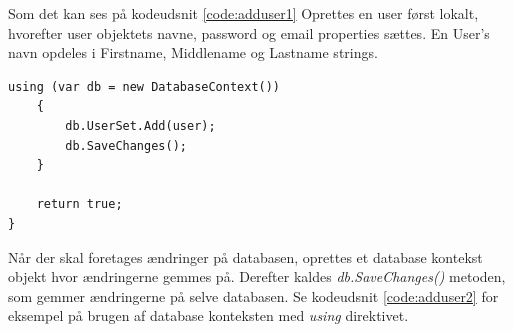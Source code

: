 Som det kan ses på kodeudsnit \ref{code:adduser1} Oprettes en user først lokalt, hvorefter user objektets navne, password og email properties sættes. En User's navn opdeles i Firstname, Middlename og Lastname strings. 

\begin{lstlisting}[caption=User objektet tilføjes i database konteksten hvorefter der gemmes på selve databasen,label=code:adduser2]
	using (var db = new DatabaseContext())
	{
		db.UserSet.Add(user);
		db.SaveChanges();
	}

	return true;
}
\end{lstlisting}

Når der skal foretages ændringer på databasen, oprettes et database kontekst objekt hvor ændringerne gemmes på. Derefter kaldes \textit{db.SaveChanges()} metoden, som gemmer ændringerne på selve databasen. Se kodeudsnit \ref{code:adduser2} for eksempel på brugen af database konteksten med \textit{using} direktivet.

